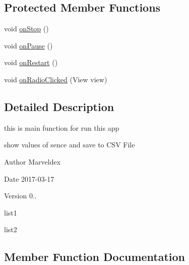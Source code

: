 \subsection*{Protected Member Functions}
\begin{DoxyCompactItemize}
\item 
void \hyperlink{classcom_1_1mdex_1_1venus_alpha01a_1_1_main_activity_a9090117d123aae404be902d80ab2a058}{on\+Stop} ()
\item 
void \hyperlink{classcom_1_1mdex_1_1venus_alpha01a_1_1_main_activity_ac6c720ec2682c3d3982daf9bf0d22abb}{on\+Pause} ()
\item 
void \hyperlink{classcom_1_1mdex_1_1venus_alpha01a_1_1_main_activity_a3d8db6a0c73d3c30efffe21f3f497fab}{on\+Restart} ()
\item 
void \hyperlink{classcom_1_1mdex_1_1venus_alpha01a_1_1_main_activity_a91e30bbe1c7978d369ec0a3db3105c40}{on\+Radio\+Clicked} (View view)
\end{DoxyCompactItemize}


\subsection{Detailed Description}
this is main function for run this app 

show values of sence and save to C\+SV File \begin{DoxyAuthor}{Author}
Marveldex 
\end{DoxyAuthor}
\begin{DoxyDate}{Date}
2017-\/03-\/17 
\end{DoxyDate}
\begin{DoxyVersion}{Version}
0.. \begin{DoxyItemize}
\item list1 \item list2 \end{DoxyItemize}

\end{DoxyVersion}


\subsection{Member Function Documentation}
\mbox{\label{classcom_1_1mdex_1_1venus_alpha01a_1_1_main_activity_a0d189b5900400ad8feff362006740eb2}} 
